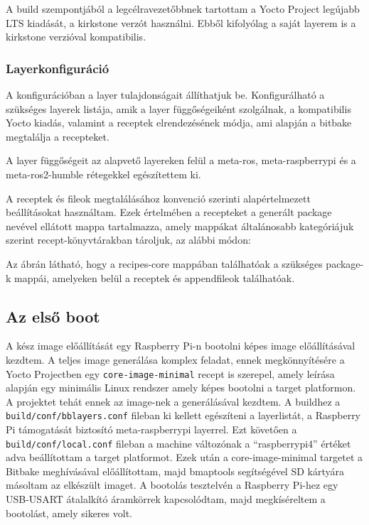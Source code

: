 A build szempontjából a legcélravezetőbbnek tartottam a Yocto Project legújabb
LTS kiadását, a kirkstone verzót használni. Ebből kifolyólag a saját layerem is a
kirkstone verzióval kompatibilis.

\subsubsection{Layerkonfiguráció}

A konfigurációban a layer tulajdonságait állíthatjuk be. Konfigurálható a
szükséges layerek listája, amik a layer függőségeiként szolgálnak, a kompatibilis
Yocto kiadás, valamint a receptek elrendezésének módja, ami alapján a bitbake
megtalálja a recepteket.

A layer függőségeit az alapvető layereken felül a meta-ros, meta-raspberrypi
és a meta-ros2-humble rétegekkel egészítettem ki.

A receptek és fileok megtalálásához konvenció szerinti alapértelmezett
beállításokat használtam. Ezek értelmében a recepteket a generált package nevével
ellátott mappa tartalmazza, amely mappákat általánosabb kategóriájuk szerint
recept-könyvtárakban tároljuk, az alábbi módon:


Az ábrán látható, hogy a recipes-core mappában találhatóak a szükséges package-k
mappái, amelyeken belül a receptek és appendfileok találhatóak. 

\subsection{Az első boot}

A kész image előállítását egy Raspberry Pi-n bootolni képes image előállításával
kezdtem. A teljes image generálása komplex feladat, ennek megkönnyítésére a Yocto
Projectben egy \verb|core-image-minimal| recept is szerepel, amely leírása
alapján egy minimális Linux rendszer amely képes bootolni a target platformon. A
projektet tehát ennek az image-nek a generálásával kezdtem. A buildhez a
\verb|build/conf/bblayers.conf| fileban ki kellett egészíteni a layerlistát, a
Raspberry Pi támogatását biztosító meta-raspberrypi layerrel. Ezt követően a
\verb|build/conf/local.conf| fileban a machine változónak a ``raspberrypi4''
értéket adva beállítottam a target platformot. Ezek után a core-image-minimal
targetet a Bitbake meghívásával előállítottam, majd bmaptools segítségével SD
kártyára másoltam az elkészült imaget. A bootolás tesztelvén a Raspberry Pi-hez
egy USB-USART átalalkító áramkörrek kapcsolódtam, majd megkíséreltem a bootolást,
amely sikeres volt.

